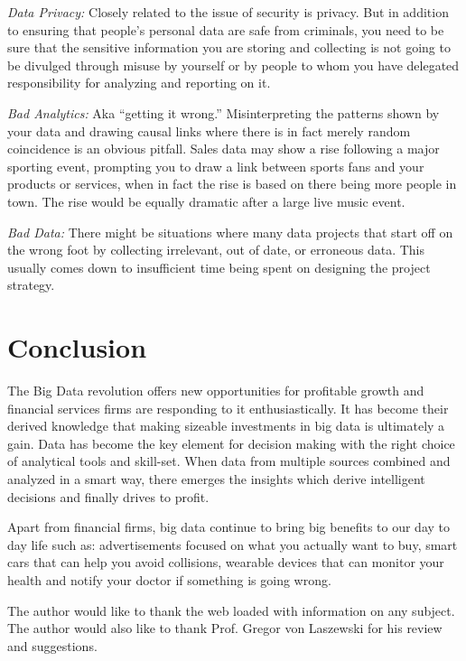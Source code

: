 \documentclass[sigconf]{acmart}
\begin{document}
\textit{Data Privacy:} Closely related to the issue of security is privacy. But in addition to ensuring that people’s personal data are safe from criminals, you need to be sure that the sensitive information you are storing and collecting is not going to be divulged through misuse by yourself or by people to whom you have delegated responsibility for analyzing and reporting on it\cite{5risks-bigdata}.

\textit{Bad Analytics:} Aka “getting it wrong.” Misinterpreting the patterns shown by your data and drawing causal links where there is in fact merely random coincidence is an obvious pitfall. Sales data may show a rise following a major sporting event, prompting you to draw a link between sports fans and your products or services, when in fact the rise is based on there being more people in town. The rise would be equally dramatic after a large live music event\cite{5risks-bigdata}.

\textit{Bad Data:} There might be situations where many data projects that start off on the wrong foot by collecting irrelevant, out of date, or erroneous data. This usually comes down to insufficient time being spent on designing the project strategy\cite{5risks-bigdata}.


\section{Conclusion}
The Big Data revolution offers new opportunities
for profitable growth and financial services firms are responding to it enthusiastically. It has become their derived knowledge that making sizeable investments in big data is ultimately a gain. Data has become the key element for decision making with the right choice of analytical tools and skill-set. When data from multiple sources combined and analyzed in a smart way, there emerges the insights which derive intelligent decisions and finally drives to profit.

Apart from financial firms, big data continue to bring big benefits to our day to day life such as: advertisements focused on what you actually want to buy, smart cars that can help you avoid collisions, wearable devices that can monitor your health and notify your doctor if something is going wrong. 

\begin{acks}

The author would like to thank the web loaded with information on any subject. The author would also like to thank Prof. Gregor von Laszewski for his review and suggestions.

\end{acks}



 
\end{document}
